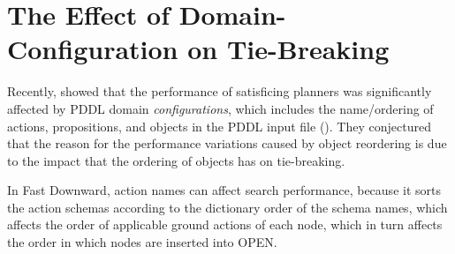 

\section{The Effect of Domain-Configuration on \astar Tie-Breaking}
Recently, \citeauthor{vallati2015effective} showed that the performance of 
satisficing planners was significantly affected by PDDL domain \emph{configurations}, which includes the name/ordering of actions, propositions, and objects in the PDDL input file (\citeyear{vallati2015effective}).
They conjectured that the reason for the performance variations caused
by object reordering is due to the impact that the ordering of objects has on tie-breaking.

In Fast Downward, action names can affect search performance, because it 
sorts the action schemas according to the dictionary
order of the schema names, which affects the order of applicable ground
actions of each node, which in turn affects the order in which nodes
are inserted into OPEN.

